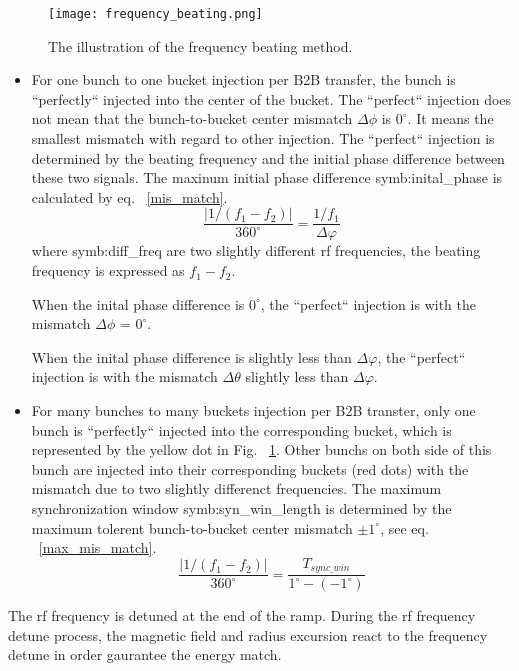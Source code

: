 \begin{figure}[!htb]
   \centering   
   \texttt{[image: frequency\_beating.png]}
   \caption{The illustration of the frequency beating method.}
   \label{frequency_beat}
\end{figure}
\begin{itemize}
\item
For one bunch to one bucket injection per B2B transfer, the bunch is ``perfectly`` injected into the center of the bucket. The ``perfect`` injection does not mean that the bunch-to-bucket center mismatch $\Delta \phi$ is $0^\circ$. It means the smallest mismatch with regard to other injection. The ``perfect`` injection is determined by the beating frequency and the initial phase difference between these two signals. The maxinum initial phase difference \gls{symb:inital_phase} is calculated by eq. ~\ref{mis_match}.
\begin{equation}
\frac{|1/(f_1-f_2)|}{360^\circ} = \frac{1/f_1}{\Delta \varphi}\label{mis_match}
\end{equation}
where \gls{symb:diff_freq} are two slightly different rf frequencies, the beating frequency is expressed as $f_1-f_2$.

When the inital phase difference is $0^\circ$, the ``perfect`` injection is with the mismatch $\Delta \phi$ = $0^\circ$.

When the inital phase difference is slightly less than $\Delta \varphi$, the ``perfect`` injection is with the mismatch $\Delta \theta$ slightly less than $\Delta \varphi$.

\item 
For many bunches to many buckets injection per B2B transter, only one bunch is ``perfectly`` injected into the corresponding bucket, which is represented by the yellow dot in Fig. ~\ref{frequency_beat}. Other bunchs on both side of this bunch are injected into their corresponding buckets (red dots) with the mismatch due to two slightly differenct frequencies. The maximum synchronization window \gls{symb:syn_win_length} is determined by the maximum tolerent bunch-to-bucket center mismatch $\pm 1^\circ$, see eq. ~\ref{max_mis_match}.
\begin{equation}
\frac{|1/(f_1-f_2)|}{360^\circ} = \frac{T_{\mathit{sync\_win}}}{1^\circ-(-1^\circ)}\label{max_mis_match}
\end{equation}

\end{itemize}

The rf frequency is detuned at the end of the ramp. During the rf frequency detune process, the magnetic field and radius excursion react to the frequency detune in order gaurantee the energy match.

